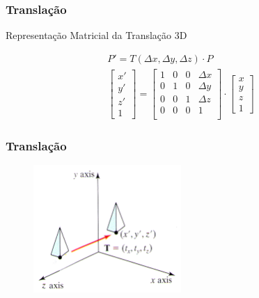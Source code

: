 \documentclass{beamer}
\begin{document}
\begin{frame}
\frametitle{Translação}

	\begin{block}{Representação Matricial da Translação 3D}
		
			\begin{eqnarray*}
				P' = T(\Delta x,\Delta y,\Delta z) \cdot P\\
				\begin{bmatrix}
					x'	\\
					y'	\\
					z'	\\
					1
				\end{bmatrix}								
				= \begin{bmatrix}
					1	&	0	&	0	&	\Delta x	\\
					0	&	1	&	0	&	\Delta y	\\
					0	&	0	& 	1	&	\Delta z	\\
					0	&	0	&	0	&	1		\\
				\end{bmatrix}
				\cdot \begin{bmatrix}
					x	\\
					y	\\
					z	\\
					1
				\end{bmatrix}
			\end{eqnarray*}
	
	\end{block}

	
	
\end{frame}

\begin{frame}
\frametitle{Translação}

	\begin{figure}[!h]
			\begin{center}
			\includegraphics[width=0.5\textwidth]{Figures/translacao3D}
			\end{center}
	\end{figure}	
\end{frame}
\end{document}
